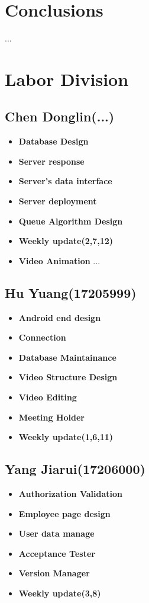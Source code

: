 \documentclass[a4paper]{article}
\begin{document}
\section{Conclusions}

...
\section{Labor Division}
\newpage
\subsection{Chen Donglin(...)}
\begin{itemize}
    \item \textbf{Database Design}
    \item \textbf{Server response}
    \item \textbf{Server's data interface}
    \item \textbf{Server deployment}
     \item \textbf{Queue Algorithm Design}
      \item \textbf{Weekly update(2,7,12)}
      \item \textbf{Video Animation}
    ...
\end{itemize}
\subsection{Hu Yuang(17205999)}
\begin{itemize}
    \item \textbf{Android end design}
    \item \textbf{Connection}
    \item \textbf{Database Maintainance}
    \item \textbf{Video Structure Design}
    \item \textbf{Video Editing}
    \item \textbf{Meeting Holder}
    \item \textbf{Weekly update(1,6,11)}
\end{itemize}
\subsection{Yang Jiarui(17206000)}
\begin{itemize}
    \item \textbf{Authorization Validation}
     \item \textbf{Employee page design}
    \item \textbf{User data manage}
    \item \textbf{Acceptance Tester}
    \item \textbf{Version Manager}
    \item \textbf{Weekly update(3,8)}
\end{itemize}
\end{document}
